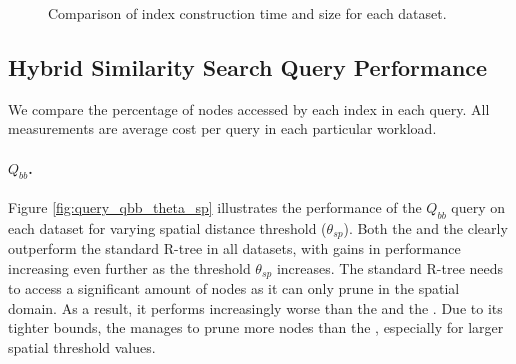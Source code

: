 \begin{figure}[!ht]
 \centering
 \caption{Comparison of index construction time and size for each dataset.}
 \label{fig:index_construction}
\end{figure}

\subsection{Hybrid Similarity Search Query Performance}

We compare the percentage of nodes accessed by each index in each query. All measurements are average cost per query in each particular workload.

\paragraph{$Q_{bb}$.} Figure \ref{fig:query_qbb_theta_sp} illustrates the performance of the $Q_{bb}$ query on each dataset for varying spatial distance threshold ($\theta_{sp}$). Both the \tsr and the \btsr clearly outperform the standard R-tree in all datasets, with gains in performance increasing even further as the threshold $\theta_{sp}$ increases. The standard R-tree needs to access a significant amount of nodes as it can only prune in the spatial domain. As a result, it performs increasingly worse than the \tsr and the \btsr. Due to its tighter bounds, the \btsr manages to prune more nodes than the \tsr, especially for larger spatial threshold values.

